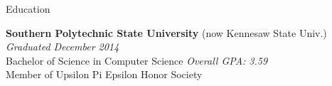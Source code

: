 \begin{rSection}{Education}

{\bf Southern Polytechnic State University} {\footnotesize (now Kennesaw State Univ.)} \hfill {\em Graduated December 2014} \\ 
Bachelor of Science in Computer Science \hfill {\em Overall GPA: 3.59} \\
Member of Upsilon Pi Epsilon Honor Society

\end{rSection}